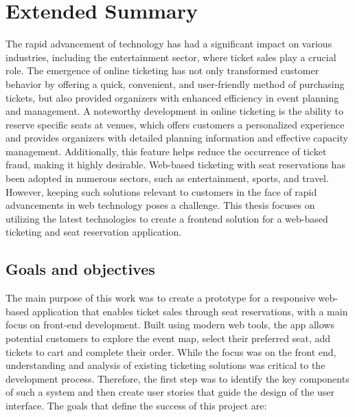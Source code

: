 \chapter*{Extended Summary}
\label{ch:extended-summary}
The rapid advancement of technology has had a significant impact on various industries, including the entertainment sector, where ticket sales play a crucial role.
The emergence of online ticketing has not only transformed customer behavior by offering a quick, convenient, and user-friendly method of purchasing tickets, but also provided organizers with enhanced efficiency in event planning and management.
A noteworthy development in online ticketing is the ability to reserve specific seats at venues, which offers customers a personalized experience and provides organizers with detailed planning information and effective capacity management.
Additionally, this feature helps reduce the occurrence of ticket fraud, making it highly desirable.
Web-based ticketing with seat reservations has been adopted in numerous sectors, such as entertainment, sports, and travel.
However, keeping such solutions relevant to customers in the face of rapid advancements in web technology poses a challenge.
This thesis focuses on utilizing the latest technologies to create a frontend solution for a web-based ticketing and seat reservation application.

\section*{Goals and objectives}
\label{sec:goals-and-objectives}
The main purpose of this work was to create a prototype for a responsive web-based application that enables ticket sales through seat reservations, with a main focus on front-end development.
Built using modern web tools, the app allows potential customers to explore the event map, select their preferred seat, add tickets to cart and complete their order.
While the focus was on the front end, understanding and analysis of existing ticketing solutions was critical to the development process.
Therefore, the first step was to identify the key components of such a system and then create user stories that guide the design of the user interface.
The goals that define the success of this project are:

